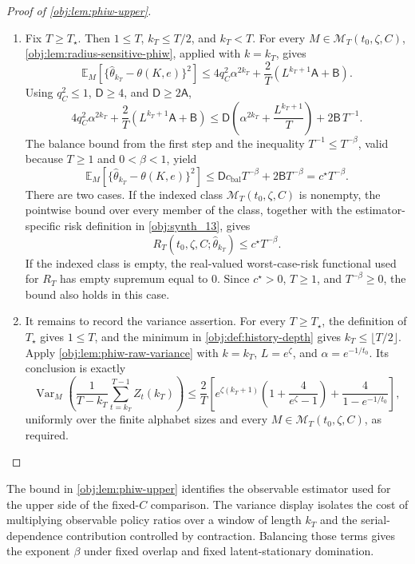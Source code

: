 \documentclass[11pt]{article}
\begin{document}
\begin{proof}[Proof of \cref{obj:lem:phiw-upper}]
\begin{enumerate}
\item Fix \(T\ge T_\star\). Then \(1\le T\), \(k_T\le T/2\), and \(k_T<T\). For every
\(M\in\mathcal M_T(t_0,\zeta,C)\), \cref{obj:lem:radius-sensitive-phiw}, applied with
\(k=k_T\), gives
\[
\mathbb E_M\!\left[
\{\widehat\theta_{k_T}-\theta(K,e)\}^2
\right]
\le
4q_C^2\alpha^{2k_T}
+
\frac{2}{T}\left(L^{k_T+1}\mathsf A+\mathsf B\right).
\]
Using \(q_C^2\le1\), \(\mathsf D\ge4\), and \(\mathsf D\ge2\mathsf A\),
\[
4q_C^2\alpha^{2k_T}
+
\frac{2}{T}\left(L^{k_T+1}\mathsf A+\mathsf B\right)
\le
\mathsf D\left(\alpha^{2k_T}+\frac{L^{k_T+1}}{T}\right)
+
2\mathsf B\,T^{-1}.
\]
The balance bound from the first step and the inequality \(T^{-1}\le T^{-\beta}\), valid because
\(T\ge1\) and \(0<\beta<1\), yield
\[
\mathbb E_M\!\left[
\{\widehat\theta_{k_T}-\theta(K,e)\}^2
\right]
\le
\mathsf D c_{\mathrm{bal}}T^{-\beta}
+
2\mathsf B T^{-\beta}
=
c^\star T^{-\beta}.
\]
There are two cases. If the indexed class \(\mathcal M_T(t_0,\zeta,C)\) is nonempty, the pointwise bound over every member of the class, together with the estimator-specific risk definition in \cref{obj:synth_13}, gives
\[
R_T(t_0,\zeta,C;\widehat\theta_{k_T})
\le
c^\star T^{-\beta}.
\]
If the indexed class is empty, the real-valued worst-case-risk functional used for \(R_T\) has empty supremum equal to \(0\). Since \(c^\star>0\), \(T\ge1\), and \(T^{-\beta}\ge0\), the bound also holds in this case.

\item It remains to record the variance assertion.
For every \(T\ge T_\star\), the definition of \(T_\star\) gives \(1\le T\), and the minimum in \cref{obj:def:history-depth} gives
\(k_T\le\lfloor T/2\rfloor\).  Apply \cref{obj:lem:phiw-raw-variance} with
\(k=k_T\), \(L=e^\zeta\), and \(\alpha=e^{-1/t_0}\).  Its conclusion is exactly
\[
\operatorname{Var}_M\!\left(
\frac1{T-k_T}\sum_{t=k_T}^{T-1}Z_t(k_T)
\right)
\le
\frac{2}{T}\left[
e^{\zeta(k_T+1)}\left(1+\frac{4}{e^\zeta-1}\right)
+\frac{4}{1-e^{-1/t_0}}
\right],
\]
uniformly over the finite alphabet sizes and every
\(M\in\mathcal M_T(t_0,\zeta,C)\), as required.
\end{enumerate}
\end{proof}

The bound in \cref{obj:lem:phiw-upper} identifies the observable estimator used for the upper side of the fixed-\(C\) comparison. The variance display isolates the cost of multiplying observable policy ratios over a window of length \(k_T\) and the serial-dependence contribution controlled by contraction. Balancing those terms gives the exponent \(\beta\) under fixed overlap and fixed latent-stationary domination.
\end{document}

